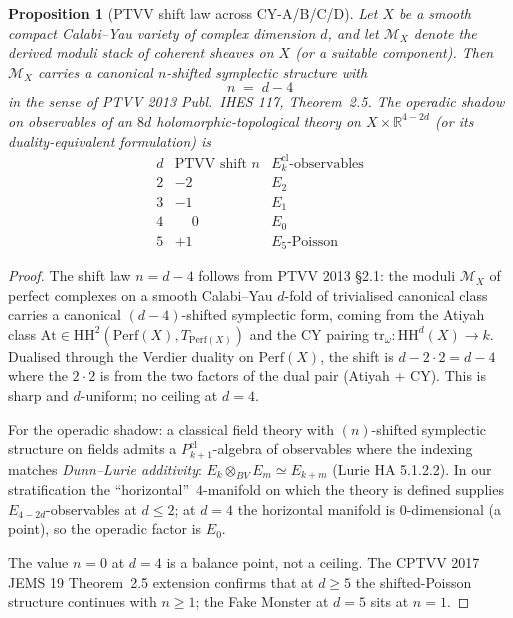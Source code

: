 \documentclass[11pt]{article}
\providecommand{\R}{\mathbb{R}}
\providecommand{\cM}{\mathcal{M}}
\providecommand{\Perf}{\mathrm{Perf}}
\providecommand{\HH}{\mathrm{HH}}
\newtheorem{proposition}[theorem]{Proposition}
\theoremstyle{definition}
\begin{document}
\begin{proposition}[PTVV shift law across CY-A/B/C/D]
\label{prop:ptvv-shift-law-d4}
Let $X$ be a smooth compact Calabi--Yau variety of complex dimension
$d$, and let $\cM_X$ denote the derived moduli stack of coherent sheaves
on $X$ (or a suitable component). Then $\cM_X$ carries a canonical
$n$-shifted symplectic structure with
\[
  n \;=\; d - 4
\]
in the sense of PTVV 2013 Publ.~IHES 117, Theorem~2.5. The operadic
shadow on observables of an $8d$ holomorphic-topological theory on
$X \times \R^{4-2d}$ (or its duality-equivalent formulation) is
\[
  \begin{array}{r|c|c}
    d & \text{PTVV shift } n & \text{$E_k^{\mathrm{cl}}$-observables} \\
    \hline
    2 & -2 & E_2 \\
    3 & -1 & E_1 \\
    4 & \phantom{-}0 & E_0 \\
    5 & +1 & E_5\text{-Poisson}
  \end{array}
\]
\end{proposition}

\begin{proof}
The shift law $n = d - 4$ follows from PTVV 2013 \S 2.1: the
moduli $\cM_X$ of perfect complexes on a smooth Calabi--Yau
$d$-fold of trivialised canonical class carries a canonical
$(d-4)$-shifted symplectic form, coming from the Atiyah class
$\mathrm{At} \in \HH^2(\Perf(X), T_{\Perf(X)})$ and the CY
pairing $\mathrm{tr}_\omega : \HH^d(X) \to k$. Dualised through the
Verdier duality on $\Perf(X)$, the shift is $d - 2 \cdot 2 = d - 4$
where the $2 \cdot 2$ is from the two factors of the dual pair
(Atiyah + CY). This is sharp and $d$-uniform; no ceiling at $d = 4$.

For the operadic shadow: a classical field theory with $(n)$-shifted
symplectic structure on fields admits a $P_{k+1}^{\mathrm{cl}}$-algebra
of observables where the indexing matches
\emph{Dunn--Lurie additivity}: $E_k \otimes_{BV} E_m \simeq E_{k+m}$
(Lurie HA 5.1.2.2). In our stratification the
``horizontal''~$4$-manifold on which the theory is defined
supplies $E_{4 - 2d}$-observables at $d \leq 2$; at $d = 4$ the
horizontal manifold is $0$-dimensional (a point), so the operadic
factor is $E_0$.

The value $n = 0$ at $d = 4$ is a balance point, not a ceiling.
The CPTVV 2017 JEMS 19 Theorem~2.5 extension confirms that at $d \geq 5$
the shifted-Poisson structure continues with $n \geq 1$; the Fake
Monster at $d = 5$ sits at $n = 1$.
\end{proof}
\end{document}
